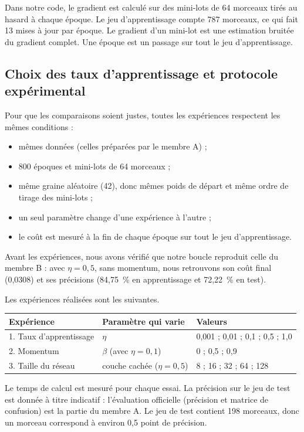 Dans notre code, le gradient est calculé sur des mini-lots de 64 morceaux
tirés au hasard à chaque époque. Le jeu d'apprentissage compte 787
morceaux, ce qui fait 13 mises à jour par époque. Le gradient d'un
mini-lot est une estimation bruitée du gradient complet. Une époque est
un passage sur tout le jeu d'apprentissage.

\subsection{Choix des taux d'apprentissage et protocole expérimental}

Pour que les comparaisons soient justes, toutes les expériences respectent
les mêmes conditions :
\begin{itemize}
  \item mêmes données (celles préparées par le membre A) ;
  \item 800 époques et mini-lots de 64 morceaux ;
  \item même graine aléatoire (42), donc mêmes poids de départ et même
        ordre de tirage des mini-lots ;
  \item un seul paramètre change d'une expérience à l'autre ;
  \item le coût est mesuré à la fin de chaque époque sur tout le jeu
        d'apprentissage.
\end{itemize}

Avant les expériences, nous avons vérifié que notre boucle reproduit celle
du membre B : avec $\eta = 0{,}5$, sans momentum, nous retrouvons son coût
final (0,0308) et ses précisions (84,75~\% en apprentissage et 72,22~\% en
test).

Les expériences réalisées sont les suivantes.

\begin{center}
\begin{tabular}{lll}
\toprule
Expérience & Paramètre qui varie & Valeurs \\
\midrule
1. Taux d'apprentissage & $\eta$ & 0,001 ; 0,01 ; 0,1 ; 0,5 ; 1,0 \\
2. Momentum & $\beta$ (avec $\eta = 0{,}1$) & 0 ; 0,5 ; 0,9 \\
3. Taille du réseau & couche cachée ($\eta = 0{,}5$) & 8 ; 16 ; 32 ; 64 ; 128 \\
\bottomrule
\end{tabular}
\end{center}

Le temps de calcul est mesuré pour chaque essai. La précision sur le jeu
de test est donnée à titre indicatif : l'évaluation officielle
(précision et matrice de confusion) est la partie du membre A. Le jeu de
test contient 198 morceaux, donc un morceau correspond à environ
0,5 point de précision.

